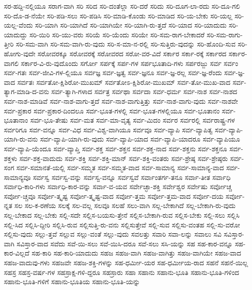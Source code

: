 {ಸರ-ಹದ್ದಿ-ನಲ್ಲಿಯೂ
ಸರಾಗ-ವಾಗಿ
ಸರಿ
ಸರಿದ
ಸರಿ-ದಂತೆಲ್ಲಾ
ಸರಿ-ದರೆ
ಸರಿದು
ಸರಿ-ದೂಗ-ಲಾ-ರದು
ಸರಿ-ದೂ-ಗಲಿ
ಸರಿ-ದೊ-ಡ-ನೆಯೇ
ಸರಿ-ಪಡಿ-ಸಲು
ಸರಿ-ಪಡಿಸಿ
ಸರಿ-ಮಾಡಿ-ಕೊಂಡು
ಸರಿ-ಮಾಡಿದ
ಸರಿ-ಯ-ಬೇಕು
ಸರಿ-ಯಲ್ಲ
ಸರಿ-ಯಲ್ಲ-ವೆಂದು
ಸರಿ-ಯಾಗಿ
ಸರಿ-ಯಾಗಿದೆ
ಸರಿ-ಯಾಗಿಯೇ
ಸರಿ-ಯಾಗಿ-ರು-ತ್ತದೆ
ಸರಿ-ಯಾದ
ಸರಿ-ಯಾದುದು
ಸರಿ-ಯಾದುದ್ದು
ಸರಿ-ಯಿರಿ
ಸರಿ-ಯು-ವರು
ಸರಿಯೆ
ಸರಿ-ಯೆಂದು
ಸರಿಯೇ
ಸರಿ-ಸಮ-ರಾಗ-ಬೇಕಾದರೆ
ಸರಿ-ಸಮ-ರಾಗು-ತ್ತೀರಿ
ಸರಿ-ಸಮ-ವಾಗಿ
ಸರಿ-ಸಮ-ವಾಗಿ-ರು-ವುದು
ಸರಿ-ಸ-ಮಾ-ನ-ರಲ್ಲಿ
ಸರಿ-ಸುತ್ತಿರು-ವುದನ್ನು
ಸರಿ-ಹೊಂದಿ-ಸುವ
ಸರಿ-ಹೋಗು-ವುದೇ
ಸರೋವರಕ್ಕೂ
ಸರೋವರಕ್ಕೆ
ಸರೋವರದ
ಸರೋ-ವರ-ವಿದೆ
ಸರ್ಕಾರ
ಸರ್ಕಾ-ರಕ್ಕೆ
ಸರ್ಕಾರದ
ಸರ್ಕಾರ-ವಾಗಲಿ
ಸರ್ಕಾರ-ವಿ-ರು-ವುದೊಂದು
ಸರ್ಗೋ
ಸರ್ಪಕ್ಕೆ
ಸರ್ಪ-ಗಳ
ಸರ್ಪಭೂತಾದಿ-ಗಳು
ಸರ್ಪರಜ್ಜು
ಸರ್ವ
ಸರ್ವಂ
ಸರ್ವ-ಗತಃ
ಸರ್ವ-ಜೀವಿ-ಗಳ-ಲ್ಲಿಯೂ
ಸರ್ವಜ್ಞ
ಸರ್ವ-ಜ್ಞತ್ವ
ಸರ್ವ-ಜ್ಞನೂ
ಸರ್ವ-ಜ್ಞ-ರಲ್ಲ
ಸರ್ವ-ಜ್ಞ-ರೆಂದು
ಸರ್ವ-ಜ್ಞ-ವಾದ
ಸರ್ವತಃ
ಸರ್ವತೋ-ಕ್ಷಿಶಿರೋ-ಮುಖಮ್
ಸರ್ವತೋಽ-ಕ್ಷಿಶಿರೋ-ಮುಖಮ್
ಸರ್ವ-ತೋ-ಮುಖ-ವಾದ
ಸರ್ವ-ತ್ಯಾಗ-ಮಾಡಿ-ದ-ವನು
ಸರ್ವ-ತ್ಯಾಗಿ-ಗಳಾದ
ಸರ್ವತ್ರ
ಸರ್ವಥಾ
ಸರ್ವದಾ
ಸರ್ವ-ಧರ್ಮ
ಸರ್ವ-ನಾಶ
ಸರ್ವ-ನಾಶದ
ಸರ್ವ-ನಾಶ-ಮಾಡಿವೆ
ಸರ್ವ-ನಾಶ-ವಾಗು-ತ್ತದೆ
ಸರ್ವ-ನಾಶ-ವಾಗುತ್ತಿತ್ತು
ಸರ್ವ-ನಾಶ-ವಾಗು-ವುದು
ಸರ್ವ-ನಾಶವೇ
ಸರ್ವ-ಪ್ರಕಾರ
ಸರ್ವ-ಪ್ರಕಾರ-ದಿಂದಲೂ
ಸರ್ವ-ಭೂತ-ಗಳಲ್ಲಿ
ಸರ್ವ-ಭೂತ-ಗಳಲ್ಲಿಯೂ
ಸರ್ವ-ಭೂತಾನಂ
ಸರ್ವ-ಭೂತಾನಾಂ
ಸರ್ವ-ಭೂ-ತೇಷು
ಸರ್ವ-ಮತ
ಸರ್ವ-ಮಾ-ವೃತ್ಯ
ಸರ್ವ-ಮಿದಂ
ಸರ್ವರ
ಸರ್ವರಲ್ಲಿ
ಸರ್ವರಾಷ್ಟ್ರ-ಗಳ
ಸರ್ವರಿಗೂ
ಸರ್ವ-ವನ್ನೂ
ಸರ್ವ-ವಿಧ
ಸರ್ವ-ವಿಶ್ವ-ವಾಗಿಯೂ
ಸರ್ವವೂ
ಸರ್ವ-ವ್ಯಾಪಿ
ಸರ್ವ-ವ್ಯಾಪಿತ್ವ
ಸರ್ವ-ವ್ಯಾಪಿ-ಯಾಗಿ-ರು-ವನು
ಸರ್ವ-ವ್ಯಾಪಿ-ಯಾಗಿ-ರು-ವುದು
ಸರ್ವ-ವ್ಯಾಪಿ-ಯಾದ
ಸರ್ವ-ವ್ಯಾಪಿ-ಯಾದರೂ
ಸರ್ವ-ವ್ಯಾಪಿಯೂ
ಸರ್ವ-ವ್ಯಾಪಿ-ಯೆಂದೂ
ಸರ್ವ-ವ್ಯಾಪ್ತಿ
ಸರ್ವ-ಶಕ್ತ
ಸರ್ವ-ಶಕ್ತನ
ಸರ್ವ-ಶಕ್ತ-ನಾದ
ಸರ್ವ-ಶಕ್ತನು
ಸರ್ವ-ಶಕ್ತನೂ
ಸರ್ವ-ಶಕ್ತಳು
ಸರ್ವ-ಶಕ್ತ-ವಾದುದು
ಸರ್ವ-ಶಕ್ತಿ
ಸರ್ವ-ಶಕ್ತಿ-ಮಾನ್
ಸರ್ವ-ಶಕ್ತಿ-ವಂತರು
ಸರ್ವ-ಶ್ರೇಷ್ಠ
ಸರ್ವ-ಶ್ರೇಷ್ಠರು
ಸರ್ವ-ಸಂಗ
ಸರ್ವ-ಸಮಾನತೆ-ಯಲ್ಲಿ
ಸರ್ವ-ಸಮ್ಮತ
ಸರ್ವ-ಸಮ್ಮತ-ವಾದ
ಸರ್ವ-ಸಾಮಾನ್ಯ
ಸರ್ವ-ಸಾಮಾನ್ಯ-ವಾದ
ಸರ್ವ-ಸಾಮಾನ್ಯವೂ
ಸರ್ವಸ್ವ
ಸರ್ವಸ್ವ-ವನ್ನು
ಸರ್ವಸ್ವ-ವನ್ನೂ
ಸರ್ವಸ್ವವೆ
ಸರ್ವಾಂತರ್ಗ-ತನೂ
ಸರ್ವಾ-ತೀತ
ಸರ್ವಾಧಿ
ಸರ್ವಾಧಿ-ಕಾರಿ-ಗಳು
ಸರ್ವಾಧಿ-ಕಾರ-ವನ್ನು
ಸರ್ವಾ-ವ-ಯವ
ಸರ್ವೇಚ್ಛಾ-ಶಕ್ತಿ
ಸರ್ವೇಶ್ವರ
ಸರ್ವೇಷು
ಸರ್ವೋಚ್ಚ
ಸರ್ವೋ-ಚ್ಚವೂ
ಸರ್ವೋ-ತ್ಕೃಷ್ಟ
ಸರ್ವೋ-ತ್ಕೃಷ್ಟ-ವಾದ
ಸರ್ವೋ-ತ್ತಮ
ಸರ್ವೋ-ತ್ತಮ-ವಾದ
ಸರ್ವೋ-ದಯ
ಸರ್ವೋ-ನ್ನತ
ಸಲ
ಸಲ-ಕ-ರಣೆಯ
ಸಲಕ್ಕೆ
ಸಲ-ವಲ್ಲ
ಸಲವೂ
ಸಲಹೆ
ಸಲು-ವಾಗಿ
ಸಲ್ಲ-ಬೇಕಾಗಿದೆ
ಸಲ್ಲ-ಬೇಕಾಗಿ-ರು-ವುದು
ಸಲ್ಲ-ಬೇಕಾದ
ಸಲ್ಲ-ಬೇಕು
ಸಲ್ಲಿ-ಸದೇ
ಸಲ್ಲಿಸ-ಬಯಸು-ತ್ತೇನೆ
ಸಲ್ಲಿಸ-ಬೇಕಾಗಿ-ರುವ
ಸಲ್ಲಿಸ-ಬೇಕು
ಸಲ್ಲಿ-ಸಲು
ಸಲ್ಲಿಸಿ
ಸಲ್ಲಿ-ಸಿದ
ಸಲ್ಲಿಸಿ-ದ್ದೀರಿ
ಸಲ್ಲಿಸಿ-ರುವ
ಸಲ್ಲಿಸುತ್ತಿ-ರು-ವನು
ಸಲ್ಲಿಸುತ್ತೇವೆ
ಸಲ್ಲಿ-ಸುವ
ಸಲ್ಲಿಸು-ವಂತಹ
ಸಲ್ಲಿ-ಸು-ವರೋ
ಸಲ್ಲಿಸು-ವುದು
ಸಲ್ಲು-ತ್ತವೆ
ಸಲ್ಲುವ
ಸಲ್ಲು-ವಂತೆ
ಸಲ್ಲು-ವುದು
ಸವಲತ್ತು
ಸವಾರಿ
ಸವಾ-ಲನ್ನು
ಸವಾಲು
ಸವಿ
ಸವಿಸ್ತಾರ-ವಾಗಿ
ಸವಿಸ್ತಾರ-ವಾದ
ಸವೆದು
ಸವೆ-ಯಿ-ಸಲು
ಸವೆ-ಯಿಸಿ-ದರೂ
ಸವೆ-ಸಲು
ಸಸಿ-ಯನ್ನು
ಸಹ
ಸಹ-ಕಾರ-ವನ್ನೂ
ಸಹ-ಕಾರ-ವಿಲ್ಲದೆ
ಸಹ-ಕಾರಿ
ಸಹ-ಕಾರಿ-ಯಾದುದು
ಸಹಜ
ಸಹಜ-ವಾಗಿ
ಸಹಜ-ವಾಗಿತ್ತು
ಸಹಜ-ವಾಗಿಯೇ
ಸಹಜ-ವಾದ
ಸಹಜ-ವಾದುವು-ಗಳು
ಸಹಜವೇ
ಸಹಜ-ಶಕ್ತಿ-ಗಳನ್ನು
ಸಹ-ಧರ್ಮೀ-ಯರ
ಸಹ-ಧರ್ಮೀಯ-ರಾದ
ಸಹನೆ
ಸಹನೆ-ಯಿಲ್ಲ
ಸಹಸ್ರ
ಸಹಸ್ರ-ವರ್ಷ-ಗಳ
ಸಹಸ್ರಾಕ್ಷ-ಗಳಿ-ದ್ದರೂ
ಸಹಸ್ರಾರು
ಸಹಾ
ಸಹಾನು
ಸಹಾನು-ಭೂತಿ
ಸಹಾನು-ಭೂತಿ-ಗಳಿಂದ
ಸಹಾನು-ಭೂತಿ-ಗಳಿಗೆ
ಸಹಾನು-ಭೂತಿಯ
ಸಹಾನು-ಭೂತಿ-ಯನ್ನು
}
